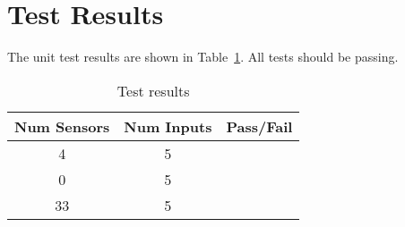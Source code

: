 \section{Test Results}
The unit test results are shown in Table~\ref{tab:results}.  All tests should be passing.
\begin{table}[H]
	\caption{Test results}
	\label{tab:results}
	\centering \fontsize{10}{10}\selectfont
	\begin{tabular}{c | c | c  } %
		\hline\hline
		\textbf{Num Sensors} 		& \textbf{Num Inputs}				  		&\textbf{Pass/Fail} \\ 
		\hline
	   4	   			& 5 & \\ 
	   0	   			& 5 & \\ 
	   33	   			& 5 & \\ 
	   \hline\hline
	\end{tabular}
\end{table}








